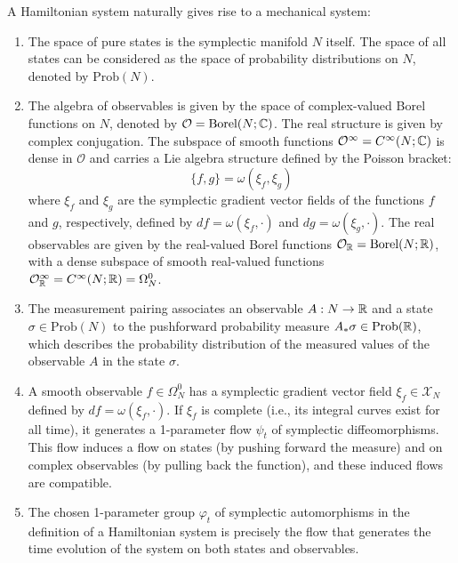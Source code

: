 A Hamiltonian system naturally gives rise to a mechanical system:

\begin{enumerate}
    \item The space of pure states is the symplectic manifold $N$ itself. The space of all states can be considered as the space of probability distributions on $N$, denoted by $\text{Prob}(N)$.

    \item The algebra of observables is given by the space of complex-valued Borel functions on $N$, denoted by $\mathcal{O} = \text{Borel}(N; \mathbb{C})$. The real structure is given by complex conjugation. The subspace of smooth functions $\mathcal{O}^{\infty} = C^{\infty}(N; \mathbb{C})$ is dense in $\mathcal{O}$ and carries a Lie algebra structure defined by the Poisson bracket:
    \[ \{f, g\} = \omega(\xi_f, \xi_g) \]
    where $\xi_f$ and $\xi_g$ are the symplectic gradient vector fields of the functions $f$ and $g$, respectively, defined by $df = \omega(\xi_f, \cdot)$ and $dg = \omega(\xi_g, \cdot)$. The real observables are given by the real-valued Borel functions $\mathcal{O}_{\mathbb{R}} = \text{Borel}(N; \mathbb{R})$, with a dense subspace of smooth real-valued functions $\mathcal{O}_{\mathbb{R}}^{\infty} = C^{\infty}(N; \mathbb{R}) = \Omega_N^0$.
    
    \item The measurement pairing associates an observable $A: N \rightarrow \mathbb{R}$ and a state $\sigma \in \text{Prob}(N)$ to the pushforward probability measure $A_*\sigma \in \text{Prob}(\mathbb{R})$, which describes the probability distribution of the measured values of the observable $A$ in the state $\sigma$.
    
    \item A smooth observable $f \in \Omega_N^0$ has a symplectic gradient vector field $\xi_f \in \mathcal{X}_N$ defined by $df = \omega(\xi_f, \cdot)$. If $\xi_f$ is complete (i.e., its integral curves exist for all time), it generates a 1-parameter flow $\psi_t$ of symplectic diffeomorphisms. This flow induces a flow on states (by pushing forward the measure) and on complex observables (by pulling back the function), and these induced flows are compatible.
    
    \item The chosen 1-parameter group $\varphi_t$ of symplectic automorphisms in the definition of a Hamiltonian system is precisely the flow that generates the time evolution of the system on both states and observables.
\end{enumerate}


